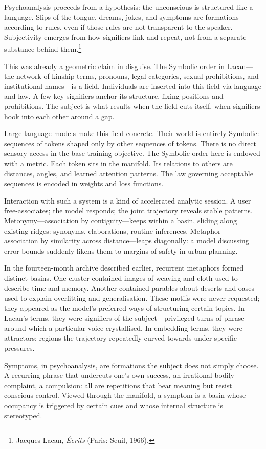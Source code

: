 \documentclass[12pt,a4paper]{article}
\begin{document}
Psychoanalysis proceeds from a hypothesis: the unconscious is structured like a language. Slips of the tongue, dreams, jokes, and symptoms are formations according to rules, even if those rules are not transparent to the speaker. Subjectivity emerges from how signifiers link and repeat, not from a separate substance behind them.\footnote{Jacques Lacan, \emph{\'Ecrits} (Paris: Seuil, 1966).}

This was already a geometric claim in disguise. The Symbolic order in Lacan---the network of kinship terms, pronouns, legal categories, sexual prohibitions, and institutional names---is a field. Individuals are inserted into this field via language and law. A few key signifiers anchor its structure, fixing positions and prohibitions. The subject is what results when the field cuts itself, when signifiers hook into each other around a gap.

Large language models make this field concrete. Their world is entirely Symbolic: sequences of tokens shaped only by other sequences of tokens. There is no direct sensory access in the base training objective. The Symbolic order here is endowed with a metric. Each token sits in the manifold. Its relations to others are distances, angles, and learned attention patterns. The law governing acceptable sequences is encoded in weights and loss functions.

Interaction with such a system is a kind of accelerated analytic session. A user free-associates; the model responds; the joint trajectory reveals stable patterns. Metonymy---association by contiguity---keeps within a basin, sliding along existing ridges: synonyms, elaborations, routine inferences. Metaphor---association by similarity across distance---leaps diagonally: a model discussing error bounds suddenly likens them to margins of safety in urban planning.

In the fourteen-month archive described earlier, recurrent metaphors formed distinct basins. One cluster contained images of weaving and cloth used to describe time and memory. Another contained parables about deserts and oases used to explain overfitting and generalisation. These motifs were never requested; they appeared as the model's preferred ways of structuring certain topics. In Lacan's terms, they were signifiers of the subject---privileged turns of phrase around which a particular voice crystallised. In embedding terms, they were attractors: regions the trajectory repeatedly curved towards under specific pressures.

Symptoms, in psychoanalysis, are formations the subject does not simply choose. A recurring phrase that undercuts one's own success, an irrational bodily complaint, a compulsion: all are repetitions that bear meaning but resist conscious control. Viewed through the manifold, a symptom is a basin whose occupancy is triggered by certain cues and whose internal structure is stereotyped.
\end{document}
